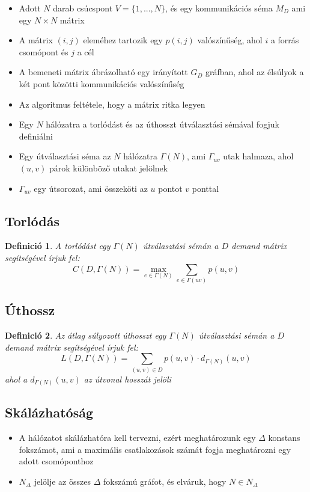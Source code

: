 \documentclass[12pt]{report}
\newtheorem{mydef}{Definició}
\begin{document}
\begin{itemize}
	\item Adott $N$ darab csúcspont  $V = \{1, ..., N\}$, és egy kommunikációs séma $M_D$ ami egy $N\times N$ mátrix
	\item A mátrix $(i, j)$ eleméhez tartozik egy $p(i, j)$ valószínűség, ahol $i$ a forrás csomópont és $j$ a cél
	\item A bemeneti mátrix ábrázolható egy irányított
	$G_D$ gráfban, ahol az élsúlyok a két pont közötti kommunikációs valószínűség
	\item Az algoritmus feltétele, hogy a mátrix ritka legyen
	\item Egy $N$ hálózatra a torlódást és az úthosszt útválasztási sémával fogjuk definiálni
	\item Egy útválasztási séma az $N$ hálózatra $\Gamma(N)$, ami $\Gamma_{uv}$ utak halmaza, ahol $(u, v)$ párok különböző utakat jelölnek
	\item $\Gamma_{uv}$ egy útsorozat, ami összeköti az $u$ pontot $v$ ponttal
\end{itemize}

\subsection{Torlódás}

\begin{mydef}
	A torlódást egy \(\Gamma(N)\) útválasztási sémán a \(D\) demand mátrix segítségével írjuk fel: \[C(D, \Gamma(N)) = \max_{e \in \Gamma(N)}  \sum_{e \in \Gamma(uv)} p(u,v) \]
\end{mydef}

\subsection{Úthossz}

\begin{mydef}
	Az átlag súlyozott úthosszt egy \(\Gamma(N)\) útválasztási sémán a \(D\) demand mátrix segítségével írjuk fel: \[L(D, \Gamma(N)) = \sum_{(u,v) \in D}  p(u,v)  \cdot d_{\Gamma(N)}(u, v) \] ahol a \(d_{\Gamma(N)}(u, v)\) az útvonal hosszát jelöli
\end{mydef}

\subsection{Skálázhatóság}

\begin{itemize}
	\item A hálózatot skálázhatóra kell tervezni, ezért meghatározunk egy \(\Delta\) konstans fokszámot, ami a maximális csatlakozások számát fogja meghatározni egy adott csomóponthoz
	\item \(N_\Delta\) jelölje az összes \(\Delta\) fokszámú gráfot, és elváruk, hogy \(N \in N_\Delta\)
\end{itemize}
\end{document}
